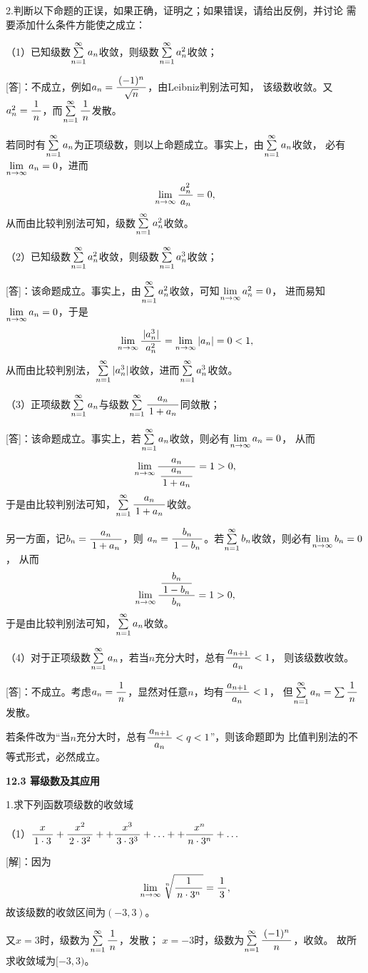 \bs

2.判断以下命题的正误，如果正确，证明之；如果错误，请给出反例，并讨论
需要添加什么条件方能使之成立：

（1）已知级数$\sumn a_n$收敛，则级数$\sumn a^2_n$收敛；

[答]：不成立，例如$a_n=\df{(-1)^n}{\sqrt n}$，由Leibniz判别法可知，
该级数收敛。又$a_n^2=\df1n$，而$\sumn\df1n$发散。

若同时有$\sumn a_n$为正项级数，则以上命题成立。事实上，由$\sumn a_n$收敛，
必有$\limn a_n=0$，进而
$$\limn\df{a_n^2}{a_n}=0,$$
从而由比较判别法可知，级数$\sumn a^2_n$收敛。

（2）已知级数$\sumn a^2_n$收敛，则级数$\sumn a^3_n$收敛；

[答]：该命题成立。事实上，由$\sumn a^2_n$收敛，可知$\limn a_n^2=0$，
进而易知$\limn a_n=0$，于是
$$\limn\df{|a_n^3|}{a_n^2}=\limn|a_n|=0<1,$$
从而由比较判别法，$\sumn|a_n^3|$收敛，进而$\sumn a^3_n$收敛。

（3）正项级数$\sumn a_n$与级数$\sumn\df{a_n}{1+a_n}$同敛散；

[答]：该命题成立。事实上，若$\sumn a_n$收敛，则必有$\limn a_n=0$，
从而
$$\limn\df{a_n}{\df{a_n}{1+a_n}}=1>0,$$
于是由比较判别法可知，$\sumn\df{a_n}{1+a_n}$收敛。

另一方面，记$b_n=\df{a_n}{1+a_n}$，则
$a_n=\df{b_n}{1-b_n}$。若$\sumn b_n$收敛，则必有$\limn b_n=0$，
从而
$$\limn\df{\df{b_n}{1-b_n}}{b_n}=1>0,$$
于是由比较判别法可知，$\sumn a_n$收敛。

（4）对于正项级数$\sumn a_n$，若当$n$充分大时，总有$\df{a_{n+1}}{a_n}<1$，
则该级数收敛。

[答]：不成立。考虑$a_n=\df1n$，显然对任意$n$，均有$\df{a_{n+1}}{a_n}<1$，
但$\sumn a_n=\sum\df1n$发散。

若条件改为“当$n$充分大时，总有$\df{a_{n+1}}{a_n}<q<1$”，则该命题即为
比值判别法的不等式形式，必然成立。
\fin

\begin{center}
	\bf 12.3 幂级数及其应用
\end{center}

1.求下列函数项级数的收敛域

（1）$\df x{1\cdot 3}+\df{x^2}{2\cdot3^2}++\df{x^3}{3\cdot3^3}
+\ldots++\df{x^n}{n\cdot3^n}+\ldots$

[解]：因为
$$\limn\sqrt[n]{\df1{n\cdot 3^n}}=\df13,$$
故该级数的收敛区间为$(-3,3)$。

又$x=3$时，级数为$\sumn\df1n$，发散；
$x=-3$时，级数为$\sumn\df{(-1)^n}n$，收敛。
故所求收敛域为$[-3,3)$。

